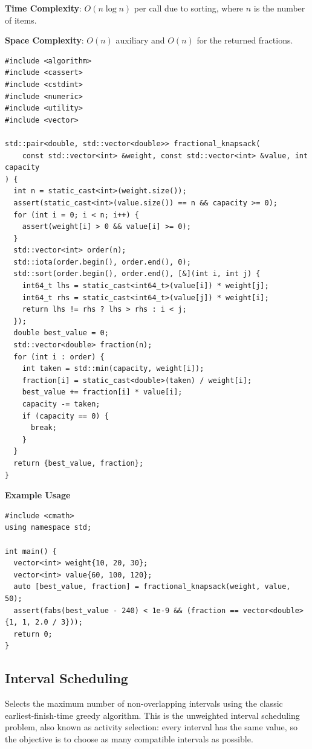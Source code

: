 \textbf{Time Complexity}: $O(n \log n)$ per call due to sorting, where $n$ is the number of items.

\textbf{Space Complexity}: $O(n)$ auxiliary and $O(n)$ for the returned fractions.

\begin{lstlisting}[style=cpp]
#include <algorithm>
#include <cassert>
#include <cstdint>
#include <numeric>
#include <utility>
#include <vector>

std::pair<double, std::vector<double>> fractional_knapsack(
    const std::vector<int> &weight, const std::vector<int> &value, int capacity
) {
  int n = static_cast<int>(weight.size());
  assert(static_cast<int>(value.size()) == n && capacity >= 0);
  for (int i = 0; i < n; i++) {
    assert(weight[i] > 0 && value[i] >= 0);
  }
  std::vector<int> order(n);
  std::iota(order.begin(), order.end(), 0);
  std::sort(order.begin(), order.end(), [&](int i, int j) {
    int64_t lhs = static_cast<int64_t>(value[i]) * weight[j];
    int64_t rhs = static_cast<int64_t>(value[j]) * weight[i];
    return lhs != rhs ? lhs > rhs : i < j;
  });
  double best_value = 0;
  std::vector<double> fraction(n);
  for (int i : order) {
    int taken = std::min(capacity, weight[i]);
    fraction[i] = static_cast<double>(taken) / weight[i];
    best_value += fraction[i] * value[i];
    capacity -= taken;
    if (capacity == 0) {
      break;
    }
  }
  return {best_value, fraction};
}
\end{lstlisting}
\textbf{Example Usage}\par
\begin{lstlisting}[style=cpp]
#include <cmath>
using namespace std;

int main() {
  vector<int> weight{10, 20, 30};
  vector<int> value{60, 100, 120};
  auto [best_value, fraction] = fractional_knapsack(weight, value, 50);
  assert(fabs(best_value - 240) < 1e-9 && (fraction == vector<double>{1, 1, 2.0 / 3}));
  return 0;
}
\end{lstlisting}
\subsection{Interval Scheduling}
\label{sec:1.5.2}
Selects the maximum number of non-overlapping intervals using the classic earliest-finish-time greedy algorithm. This is the unweighted interval scheduling problem, also known as activity selection: every interval has the same value, so the objective is to choose as many compatible intervals as possible.

